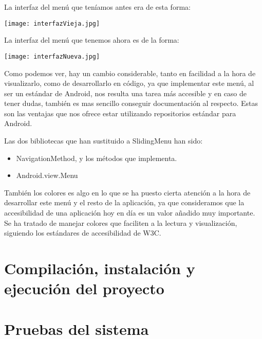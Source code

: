 La interfaz del menú que teníamos antes era de esta forma:

\texttt{[image: interfazVieja.jpg]}

La interfaz del menú que tenemos ahora es de la forma:

\texttt{[image: interfazNueva.jpg]}

Como podemos ver, hay un cambio considerable, tanto en facilidad a la hora de visualizarlo, como de desarrollarlo en código, ya que implementar este menú, al ser un estándar de Android, nos resulta una tarea más accesible y en caso de tener dudas, también es mas sencillo conseguir documentación al respecto. Estas son las ventajas que nos ofrece estar utilizando repositorios estándar para Android.

Las dos bibliotecas que han sustituido a SlidingMenu han sido:

\begin{itemize}
\item NavigationMethod, y los métodos que implementa.
\item Android.view.Menu
\end{itemize}

También los colores es algo en lo que se ha puesto cierta atención a la hora de desarrollar este menú y el resto de la aplicación, ya que consideramos que la accesibilidad de una aplicación hoy en día es un valor añadido muy importante. Se ha tratado de manejar colores que faciliten a la lectura y visualización, siguiendo los estándares de accesibilidad de W3C.


 

\section{Compilación, instalación y ejecución del proyecto}

\section{Pruebas del sistema}
